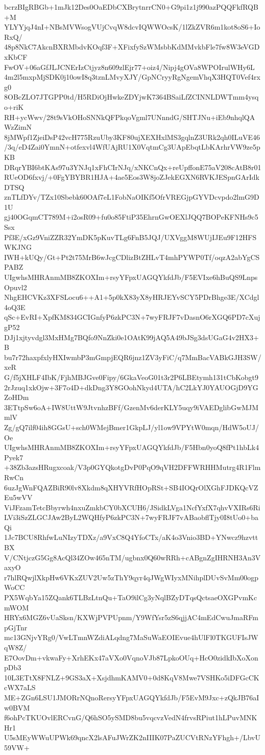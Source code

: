 bcrzBIgRBGb+1mJk12Des0OaEDbCXBrytnrrCN0+G9pi1z1j990azPQQFkfRQB+M
YLYYjqJ4nI+NBsMVWsogVUjCvqW8dcvIQWWOcsK/1lZkZVR6m1kot8oS6+IoRxQ/
48p8NkC7AkcnBXRMbdvKOqf3F+XFixfySzWMsbbKdMMvkbFle7fw8W3eVGDxKbCF
FwOV+06aGfJLJCNErIzCtjyz8n609zlEjr77+oiz4/Nipj4gOVa8WPOIrulWHy6L
4m2l5mxpMjSDK0j10owI8q3tznLMvyXJY/GpNCryyRgNgemVhqX3HQT0Vef4rxg0
8OBcZLO7JTGPP0td/H5RDiOjHwkeZDYjwK7364BSaiLfZCINNLDWTmm4ysqo+riK
RH+ycWwv/28t9sVkOHoSNNkQFPkqoVgml7UNnndG/SHTJNu+iEb9nhqlQAWzZimN
8jMWpf1ZjeiDsP42vcH775RzuUby3KF80ujXEXHxlMS3gqlnZ3URk2qh0ILuVE46
/3q/eD4Zai0YmnN+otfexvl4WfUAjRU1X0VqtmCg3UApEbqtLbKArhrVW9ze5pKB
DRqrYBI6btKAs97u3YNJq1xFhCIrNJq/xNKCnQx+reUpffonE75aV208cAtB8r01
RUeOD6fxvj/+0FgYBYBR1HJA+4ae5Eos3W8joZJekEGXN6RVKJESpnGArIdkDTSQ
znTLfDYv/TZx10Sbebk60OAf7eL1FobNaOIKf5OfrVREGjpGYVDcvpdo2lmG9D1U
gj40OGqmCT789M+i2osR09+fu0o85FtiP35EhrnGwOEXlJQQ7BOPeKFNHs9c5Ssx
Pf3E/xGz9VniZZR32YmDK5pKuvTLg6FnB5JQJ/UXVggM8WUjIJEu9F12HFSWKJNG
IWH+kUQy/Gt+Pt2t75MrB6wJcgCDlizBtZHLvT4mhPYWP0Tf/oqzA2abYgCSPABZ
UIgwhsMHRAnmMB8ZKOXIm+rsyYFpxUAGQYkfdJb/F5EVIxe6hBuQS9LnpsOpuvl2
NhgEHCVKz3XFSLocu6++A1+5p0kX83yX8yHRJEYvSCY5PDrBhge3E/XCdgl4oQ3E
qSc+EvRI+XpfKM834GCIGnfyP6zkPC3N+7wyFRJF7vDasnO6rXGQ6PD7cXujgP52
DJj1xjtyvdgl3MxHMg7BQfo9NnZki0e1OAtK99jAQ5A49bJSg3dsUGaG4v2HX3+B
bu7r72haxpfxlyHXIwmbP3mGmpjEQR6jnz1ZV3yFiC/q7MmBacVABkGJH3SW/xeR
G/f5jXHLF4IbK/FjhMBJGve0Fipy/6GkaVeoG01t3r2P6LBEtymh131tCbKobgt9
2rJzuq1xkOjw+3F7o4D+dkDng3Y8GOohNkyd4UTA/hC2LkYJ0YAUOGjD9YGZoHDm
3ETtpSw6oA+IW8UttW9JtvnhzBFf/GzenMv6derKLY5uqy9iVAEDglibGwMJMmlV
Zg/gQ7ilf04ih8GGsU+sch0WMejBmer1GkpLJ/yl1ow9VPYtW0mqn/HdW5oUJ/Oe
UIgwhsMHRAnmMB8ZKOXIm+rsyYFpxUAGQYkfdJb/F5Hbn0yoQ8fPt1hbLk4Pyek7
+38Zb3azsHRugxcoak/V3p0GYQkotgDvP0PqO9qVH2DFFWRHHMutrg4R1FlmRwCn
6uzJgWnFQAZBiR90lv8Xkdm8qXHYVRfHOpRSt+SB4IOQrOlXGhFJDKQcVZEu5wVV
ViJFzamTetcBbyrwh4nxuZmkbCY0bXCUH6/JSidkLVga1NcfYxfX7qhvVXIRs6Ri
LVi3iSzZLGCJAw2ByL2WQHfyP6zkPC3N+7wyFRJF7vABaobflTjy0I8tUo0+baQi
1Jc7BCU8RhfwLuNIzyTDXz/a9VxC8Q4YfoCTx/aK4o3Vnio3BD+YNwcz9hzvttBX
V/CNtjczG5Gg8AcQl34ZOw465nTM/ugbnx0Q60wRRh+cABgnZgIHRNH3An3VaxyO
r7hlRQwjlXkpHw6VKxZUV2Uw5zThY9qyr4qJWgWIyxMNihplDUvSvMm00ogpWoCC
PX5WqbYa15ZQank6TLBzLtnQu+TaO9ilCg3yNqlBZyDTqsQctsaeOXGPvmKcmWOM
HRYx6MGZ6vUaSksn/KXWjPVPUpnm/Y9WfYsr5zS6qjjAC4mEdCwuJmaRFmpGjTnr
mc13GNjvYRg0/VwLTmnWZdiALqdng7MaSuWaEOIEvue4hUlFl0TKGUFIsJWqW8Z/
E7OovDm+vkwaFy+XrhEKx47aVXo0VqnoVJb87LpkoOUq+HcO0zidkIbXoXonpDb3
10L3ETtX8FNLZ+9GS3aX+XsjdhmKAMV0+0d8KqV8Mwe7VSHKo5iDFGcCKcWX7aLS
ME+ZGn6LSU1JMORrNQnoRersyYFpxUAGQYkfdJb/F5EvM9Jxc+zQkJB76aIw0BVM
f6ohPcTKUOvlERCvnG/Q6hSO5ySMD8bu5vqcvzVedN4frvsRPiut1hLPuvMNKHr1
U5sMEyWWuUPWk69qncX2lsAFuJWrZK2nIIIK07PaZUCVtRNzYFhgh+/LbvU59VW+
